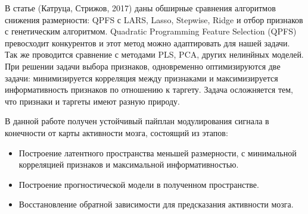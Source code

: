 \documentclass{article}
\begin{document}
В статье (Катруца, Стрижов, 2017)\cite{qpfs}  даны обширные сравнения алгоритмов снижения размерности: QPFS с LARS, Lasso, Stepwise, Ridge и отбор признаков с генетическим алгоритмом. Quadratic Programming Feature Selection (QPFS) \cite{qpfs} превосходит конкурентов и этот метод можно адаптировать для нашей задачи. Так же проводится сравнение с методами PLS, PCA, других нелинйных моделей.  При решении задачи выбора признаков, одновременно оптимизируются две задачи: минимизируется корреляция между признаками и максимизируется информативность признаков по отношению к таргету. Задача осложняется тем, что признаки и таргеты имеют разную природу. \par
В данной работе получен устойчивый пайплан модулирования сигнала в конечности от карты активности мозга, состоящий из этапов:
\begin{itemize}
    \item Построение латентного пространства меньшей размерности, с минимальной корреляцией признаков и максимальной информативностью.
    \item Построение прогностической модели в полученном пространстве.
     \item Восстановление обратной зависимости для предсказания активности мозга.
\end{itemize}
\end{document}
